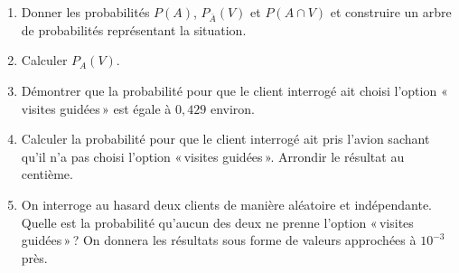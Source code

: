 \documentclass[a4paper,11pt,exos]{nsi} %
\begin{document}
\begin{enumerate}
    \item Donner les probabilités $P(A)$, $P_{\bar{A}}(V)$ et $P(A \cap V)$ et construire un arbre de probabilités représentant la situation.
    \item Calculer $P_A(V)$.
    \item Démontrer que la probabilité pour que le client interrogé ait choisi l'option  «\,visites guidées\,»  est égale à $0{,}429$ environ.
    \item Calculer la probabilité pour que le client interrogé ait pris l'avion sachant qu'il n'a pas choisi l'option  «\,visites guidées\,». Arrondir le résultat au centième.
    \item On interroge au hasard deux clients de manière aléatoire et indépendante.\\ Quelle est la probabilité qu'aucun des deux ne prenne l'option  «\,visites guidées\,»\,? On donnera les résultats sous forme de valeurs approchées à $10^{-3}$ près.
\end{enumerate}
\end{document}

